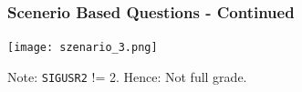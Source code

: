 \begin{frame}
  \frametitle{Scenerio Based Questions - Continued}
  \centering
  \texttt{[image: szenario\_3.png]}

  Note: \texttt{SIGUSR2} != 2. Hence: Not full grade.
\end{frame}


% 
%       
% 
%       
%   






